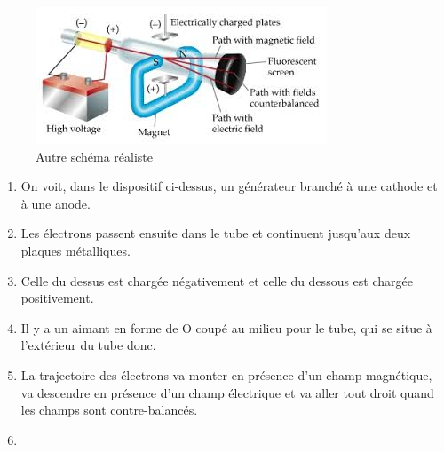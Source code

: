 \documentclass[../main.tex]{subfiles}
\begin{document}
\begin{figure}[h!]
    \centering
    \includegraphics[scale=0.9]{images/08.JJ-Thomson..jpg}
    \caption{Autre schéma réaliste}
    \label{fig:my_label}
\end{figure}

\begin{enumerate}
    \item On voit, dans le dispositif ci-dessus, un générateur branché à une cathode et à une anode.
    \item Les électrons passent ensuite dans le tube et continuent jusqu'aux deux plaques métalliques.
    \item Celle du dessus est chargée négativement et celle du dessous est chargée positivement.
    \item Il y a un aimant en forme de O coupé au milieu pour le tube, qui se situe à l'extérieur du tube donc.
    \item La trajectoire des électrons va monter en présence d'un champ magnétique, va descendre en présence d'un champ électrique et  va aller tout droit quand les champs sont contre-balancés. 
    \item 
\end{enumerate}
\end{document}

